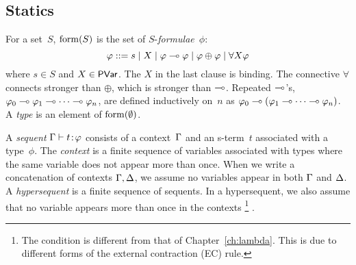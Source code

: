 
\subsection{Statics}
For a set~$S$,
$\mathrm{form}(S)$ is the set of $S$-\textit{formulae}~$\phi$:
\[
\varphi::= s \mid X \mid \varphi\multimap\varphi\mid \varphi\oplus\varphi\mid
\forall X \varphi
\]
where $s\in S$ and $X\in \mathsf{PVar}$. The $X$ in the
last clause is binding.
The connective $\forall$ connects stronger than $\oplus$, which is
stronger than $\multimap$.
Repeated $\multimap$'s,
$\varphi_0\multimap\varphi_1\multimap\cdots\multimap\varphi_n$, are defined inductively on~$n$
as
$\varphi_0\multimap(\varphi_1\multimap\cdots\multimap\varphi_n)$.
A \textit{type} is an element of $\mathrm{form}(\emptyset)$.

A \textit{sequent} ${\Gamma}\vdash{ {t} \mathord{\colon\kern -2pt}{\varphi} }$ consists of a
context~$\Gamma$ and an s-term~$t$ associated with a type~$\phi$.
The \textit{context} is a finite sequence of variables associated
with types where the same variable does not appear more than once.
When we write a concatenation of contexts $\Gamma,\Delta$, we assume no variables
appear in both $\Gamma$ and $\Delta$.
A \textit{hypersequent} is a finite sequence of sequents.
In a hypersequent, we also assume that no variable appears more than once in
the contexts%
\footnote{The condition is different from that of
Chapter~\ref{ch:lambda}.  This is due to different forms of the
external contraction (EC) rule.}%
.

